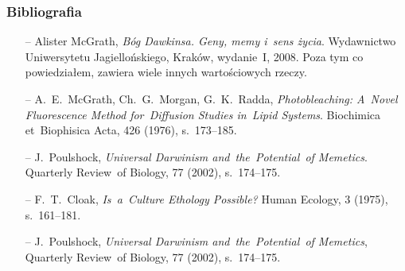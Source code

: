 \documentclass[10pt,t]{beamer}
\begin{document}
\begin{frame}
  \frametitle{Bibliografia}


  \begin{itemize}

  \item[--] Alister McGrath, \textit{Bóg Dawkinsa. Geny, memy i~sens
      życia}. Wydawnictwo Uniwersytetu Jagiellońskiego, Kraków,
    wydanie~I, 2008. Poza tym co powiedziałem, zawiera wiele innych
    wartościowych rzeczy.

  \item[--] A.~E.~McGrath, Ch.~G.~Morgan, G.~K.~Radda,
    \textit{Photobleaching: A~Novel Fluorescence Method for~Diffusion
      Studies in~Lipid Systems}. Biochimica et~Biophisica Acta,
    426 (1976), s.~173--185.

  \item[--] J.~Poulshock, \textit{Universal Darwinism
      and~the~Potential~of Memetics}. Quarterly Review~of
    Biology, 77 (2002), s.~174--175.

  \item[--] F.~T.~Cloak, \textit{Is~a~Culture Ethology Possible?}
    Human Ecology, 3 (1975), s.~161--181.

  \item[--] J.~Poulshock, \textit{Universal Darwinism and~the~Potential~of
      Memetics}, Quarterly Review~of Biology, 77 (2002), s.~174--175.
  \end{itemize}

\end{frame}
\end{document}
